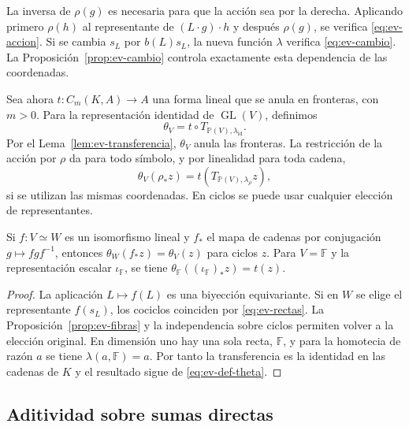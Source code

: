 La inversa de $\rho(g)$ es necesaria para que la acción sea por la derecha. Aplicando primero $\rho(h)$ al representante de $(L\cdot g)\cdot h$ y después $\rho(g)$, se verifica \eqref{eq:ev-accion}. Si se cambia $s_L$ por $b(L)s_L$, la nueva función $\lambda$ verifica \eqref{eq:ev-cambio}. La Proposición~\ref{prop:ev-cambio} controla exactamente esta dependencia de las coordenadas.

Sea ahora $t:C_m(K,A)\to A$ una forma lineal que se anula en fronteras, con $m>0$. Para la representación identidad de $\operatorname{GL}(V)$, definimos
\begin{equation}
 \theta_V=t\circ T_{\mathbb P(V),\lambda_{\mathrm{id}}}.
 \label{eq:ev-def-theta}
\end{equation}
Por el Lema~\ref{lem:ev-transferencia}, $\theta_V$ anula las fronteras. La restricción de la acción por $\rho$ da para todo símbolo, y por linealidad para toda cadena,
\begin{equation}
 \theta_V(\rho_*z)=t(T_{\mathbb P(V),\lambda_\rho}z),
 \label{eq:ev-eval-rho}
\end{equation}
si se utilizan las mismas coordenadas. En ciclos se puede usar cualquier elección de representantes.

\begin{proposicion}
\label{prop:ev-iso}
Si $f:V\simeq W$ es un isomorfismo lineal y $f_*$ el mapa de cadenas por conjugación $g\mapsto f g f^{-1}$, entonces $\theta_W(f_*z)=\theta_V(z)$ para ciclos $z$. Para $V=\mathbb F$ y la representación escalar $\iota_{\mathbb F}$, se tiene $\theta_{\mathbb F}((\iota_{\mathbb F})_*z)=t(z)$.
\end{proposicion}
\begin{proof}
La aplicación $L\mapsto f(L)$ es una biyección equivariante. Si en $W$ se elige el representante $f(s_L)$, los cociclos coinciden por \eqref{eq:ev-rectas}. La Proposición~\ref{prop:ev-fibras} y la independencia sobre ciclos permiten volver a la elección original. En dimensión uno hay una sola recta, $\mathbb F$, y para la homotecia de razón $a$ se tiene $\lambda(a,\mathbb F)=a$. Por tanto la transferencia es la identidad en las cadenas de $K$ y el resultado sigue de \eqref{eq:ev-def-theta}.
\end{proof}

\subsection{Aditividad sobre sumas directas}

